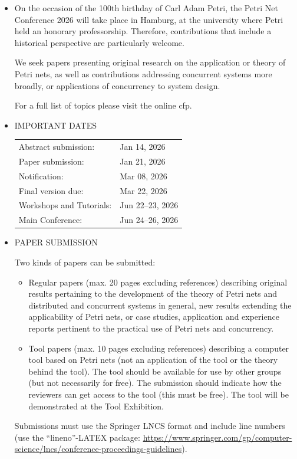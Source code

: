 \documentclass[prodmode,acmtecs]{acmsmall} %
\begin{document}
\begin{itemize}\item  On the occasion of the 100th birthday of Carl Adam Petri, the Petri Net Conference 2026 will take place in Hamburg, at the university where Petri held an honorary professorship. Therefore, contributions that include a historical perspective are particularly welcome. 
 
  We seek papers presenting original research on the application or theory of Petri nets, as well as contributions addressing concurrent systems more broadly, or applications of concurrency to system design. 
 
  For a full list of topics please visit the online cfp.  
 
\item  IMPORTANT DATES 
 
\begin{tabulary}{\linewidth}{LL}Abstract submission:  & Jan 14, 2026 \\
Paper submission:  & Jan 21, 2026 \\
Notification:  & Mar 08, 2026 \\
Final version due:  & Mar 22, 2026 \\
Workshops and Tutorials:  & Jun 22–23, 2026 \\
Main Conference:  & Jun 24–26, 2026 \\
\end{tabulary}
 
\item  PAPER SUBMISSION   
 
  Two kinds of papers can be submitted: 
 
\begin{itemize}\item  Regular papers (max. 20 pages excluding references) describing original results pertaining to the development of the theory of Petri nets and distributed and concurrent systems in general, new results extending the applicability of Petri nets, or case studies, application and experience reports pertinent to the practical use of Petri nets and concurrency.
\item  Tool papers (max. 10 pages excluding references) describing a computer tool based on Petri nets (not an application of the tool or the theory behind the tool). The tool should be available for use by other groups (but not necessarily for free). The submission should indicate how the reviewers can get access to the tool (this must be free). The tool will be demonstrated at the Tool Exhibition.
\end{itemize} 
  Submissions must use the Springer LNCS format and include line numbers (use the ``lineno''-LATEX package: \href{https://www.springer.com/gp/computer-science/lncs/conference-proceedings-guidelines}{https://www.springer.com/gp/computer-science/lncs/conference-proceedings-guidelines}). 
 

\end{itemize}
\end{document}
